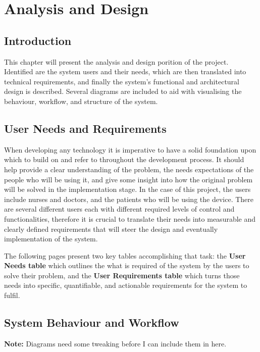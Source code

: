 \chapter{Analysis and Design}

\section{Introduction} %
This chapter will present the analysis and design porition of the project. Identified are the system users and their needs, which are then translated into technical requirements, and finally the system's functional and architectural design is described. Several diagrams are included to aid with visualising the behaviour, workflow, and structure of the system.

\section{User Needs and Requirements} %
When developing any technology it is imperative to have a solid foundation upon which to build on and refer to throughout the development process. It should help provide a clear understanding of the problem, the needs expectations of the people who will be using it, and give some insight into how the original problem will be solved in the implementation stage. In the case of this project, the users include nurses and doctors, and the patients who will be using the device. There are several different users each with different required levels of control and functionalities, therefore it is crucial to translate their needs into measurable and clearly defined requirements that will steer the design and eventually implementation of the system.

The following pages present two key tables accomplishing that task: the \textbf{User Needs table} which outlines the what is required of the system by the users to solve their problem, and the \textbf{User Requirements table} which turns those needs into specific, quantifiable, and actionable requirements for the system to fulfil.


\clearpage

\clearpage

\section{System Behaviour and Workflow} %
\textbf{Note:} Diagrams need some tweaking before I can include them in here.

